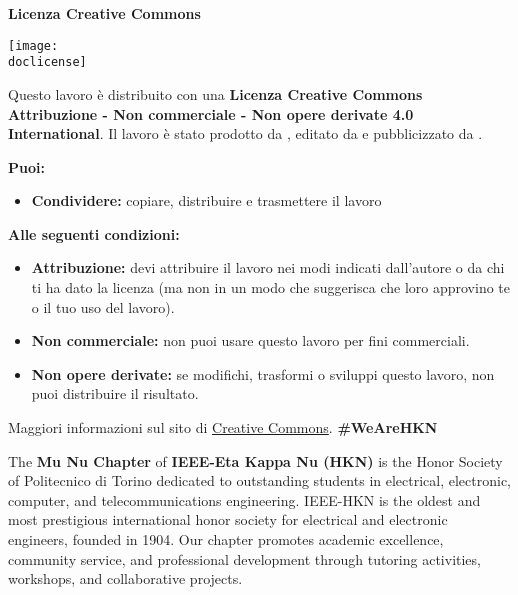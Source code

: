         \vfill

        \begin{center}
            \begin{minipage}{\linewidth}
                \begin{minipage}{0.6\textwidth}
                    {\Large\textbf{Licenza Creative Commons}}
                \end{minipage}
                \begin{minipage}{0.39\linewidth}
                    \raggedleft
                    \texttt{[image: \\doclicense]}
                \end{minipage}
            \end{minipage}
        \end{center}

        Questo lavoro è distribuito con una \textbf{Licenza Creative Commons Attribuzione - Non commerciale - Non opere derivate 4.0 International}.
        Il lavoro è stato prodotto da \DDauthors\ifx\DDeditors\empty\else, editato da \DDeditors\fi{} e pubblicizzato da \DDorganization.

        \textbf{Puoi:}
        \begin{itemize}[topsep=0pt,itemsep=0pt,parsep=0pt,partopsep=0pt]
            \item \textbf{Condividere:} copiare, distribuire e trasmettere il lavoro
        \end{itemize}

        \textbf{Alle seguenti condizioni:}
        \begin{itemize}[topsep=0pt,itemsep=0pt,parsep=0pt,partopsep=0pt]
            \item \textbf{Attribuzione:} devi attribuire il lavoro nei modi indicati dall'autore o da chi ti ha dato la licenza (ma non in un modo che suggerisca che loro approvino te o il tuo uso del lavoro).
            \item \textbf{Non commerciale:} non puoi usare questo lavoro per fini commerciali.
            \item \textbf{Non opere derivate:} se modifichi, trasformi o sviluppi questo lavoro, non puoi distribuire il risultato.
        \end{itemize}

        Maggiori informazioni sul sito di \href{https://creativecommons.org/licenses/by-nc-nd/4.0/}{Creative Commons}.
    \else
        {\Large\textbf{\#WeAreHKN}}
        \vspace{0.2cm}
        \par
        The \textbf{Mu Nu Chapter} of \textbf{IEEE-Eta Kappa Nu (HKN)} is the Honor Society of Politecnico di Torino dedicated to outstanding students in electrical, electronic, computer, and telecommunications engineering. IEEE-HKN is the oldest and most prestigious international honor society for electrical and electronic engineers, founded in 1904. Our chapter promotes academic excellence, community service, and professional development through tutoring activities, workshops, and collaborative projects.

